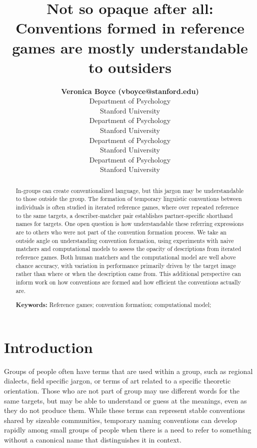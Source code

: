 \documentclass[10pt, letterpaper]{article}
\title{Not so opaque after all: Conventions formed in reference games
are mostly understandable to outsiders}
\author{{\large \bf Veronica Boyce (vboyce@stanford.edu)} \\ Department of Psychology \\ Stanford University \And {\large \bf Ben Prystawski (benpry@stanford.edu)} \\Department of Psychology \\ Stanford University \AND {\large \bf Alvin Wei Ming Tan (tanawm@stanford.edu)} \\ Department of Psychology \\ Stanford University \And {\large \bf Michael C. Frank (mcfrank@stanford.edu)} \\ Department of Psychology \\ Stanford University}
\begin{document}
\maketitle

\begin{abstract}
In-groups can create conventionalized language, but this jargon may be
understandable to those outside the group. The formation of temporary
linguistic conventions between individuals is often studied in iterated
reference games, where over repeated reference to the same targets, a
describer-matcher pair establishes partner-specific shorthand names for
targets. One open question is how understandable these referring
expressions are to others who were not part of the convention formation
process. We take an outside angle on understanding convention formation,
using experiments with naive matchers and computational models to assess
the opacity of descriptions from iterated reference games. Both human
matchers and the computational model are well above chance accuracy,
with variation in performance primarily driven by the target image
rather than where or when the description came from. This additional
perspective can inform work on how conventions are formed and how
efficient the conventions actually are.

\textbf{Keywords:}
Reference games; convention formation; computational model;
\end{abstract}

\section{Introduction}\label{introduction}

Groups of people often have terms that are used within a group, such as
regional dialects, field specific jargon, or terms of art related to a
specific theoretic orientation. Those who are not part of group may use
different words for the same targets, but may be able to understand or
guess at the meanings, even as they do not produce them. While these
terms can represent stable conventions shared by sizeable communities,
temporary naming conventions can develop rapidly among small groups of
people when there is a need to refer to something without a canonical
name that distinguishes it in context.
\end{document}
